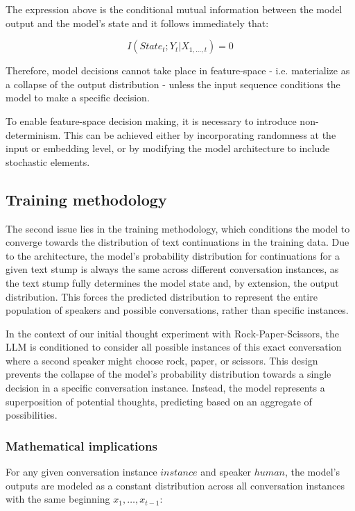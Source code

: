 \documentclass{article}
\begin{document}
The expression above is the conditional mutual information between the model output and the model's state and it follows immediately that:

\begin{equation}
I(State_t; Y_t | X_{1,\dots,t}) = 0
\end{equation}

Therefore, model decisions cannot take place in feature-space - i.e. materialize as a collapse of the output distribution - unless the input sequence conditions the model to make a specific decision. 

To enable feature-space decision making, it is necessary to introduce non-determinism. This can be achieved either by incorporating randomness at the input or embedding level, or by modifying the model architecture to include stochastic elements.

\subsection{Training methodology}
The second issue lies in the training methodology, which conditions the model to converge towards the distribution of text continuations in the training data. Due to the architecture, the model's probability distribution for continuations for a given text stump is always the same across different conversation instances, as the text stump fully determines the model state and, by extension, the output distribution. This forces the predicted distribution to represent the entire population of speakers and possible conversations, rather than specific instances. 

In the context of our initial thought experiment with Rock-Paper-Scissors, the LLM is conditioned to consider all possible instances of this exact conversation where a second speaker might choose rock, paper, or scissors. This design prevents the collapse of the model's probability distribution towards a single decision in a specific conversation instance. Instead, the model represents a superposition of potential thoughts, predicting based on an aggregate of possibilities.

\subsubsection{Mathematical implications}
For any given conversation instance $instance$ and speaker $human$, the model's outputs are modeled as a constant distribution across all conversation instances with the same beginning $x_1, \dots, x_{t-1}$:
\end{document}
